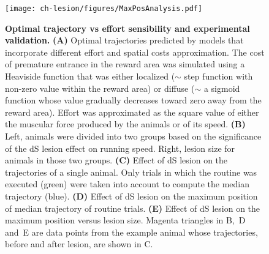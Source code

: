 \begin{figure}[bth!]
 \begin{center}
	\texttt{[image: ch-lesion/figures/MaxPosAnalysis.pdf]}
	\caption[Optimal Trajectory and Experimental Validation]
	{\textbf{Optimal trajectory vs effort sensibility and experimental validation.}
	\textbf{(A)} Optimal trajectories predicted by models that incorporate different effort and spatial costs approximation.
	The cost of premature entrance in the reward area was simulated using a Heaviside function that was either localized ($\sim$ step function with non-zero value within the reward area) or diffuse ($\sim$ a sigmoid function whose value gradually decreases toward zero away from the reward area).
	Effort was approximated as the square value of either the muscular force produced by the animals or of its speed.
	\textbf{(B)} Left, animals were divided into two groups based on the significance of the dS lesion effect on running speed. Right, lesion size for animals in those two groups.
	\textbf{(C)} Effect of dS lesion on the trajectories of a single animal. Only trials in which the routine was executed (green) were taken into account to compute the median trajectory (blue).
	\textbf{(D)} Effect of dS lesion on the maximum position of median trajectory of routine trials.
	\textbf{(E)} Effect of dS lesion on the maximum position versus lesion size.
	Magenta triangles in B,~D and~E are data points from the example animal whose trajectories, before and after lesion, are shown in C.
	}
	\label{fig:lesion:maxPos}
 \end{center}
\end{figure}
